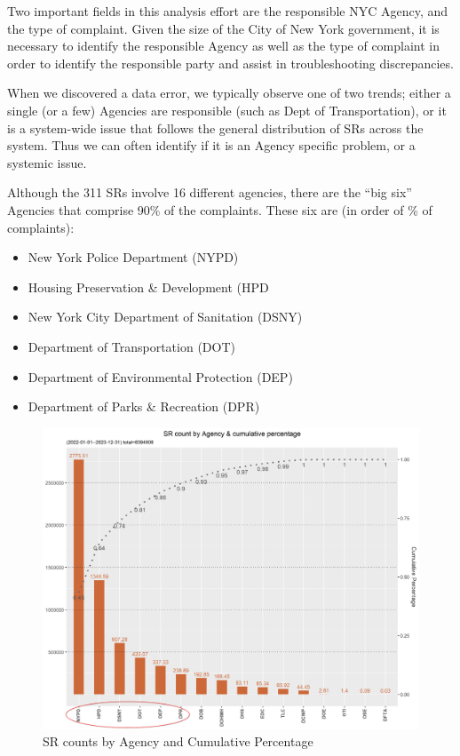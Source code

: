 \documentclass[12pt, titlepage]{article}
\begin{document}
\FloatBarrier %

Two important fields in this analysis effort are the responsible NYC Agency, and the type of complaint.
Given the size of the City of New York government, it is necessary to identify the responsible Agency as well as the type of complaint in order to 
identify the responsible party and assist in troubleshooting discrepancies.

When we discovered a data error, we typically observe one of two trends; either a single (or a few) Agencies are responsible (such as Dept of Transportation), 
or it is a system-wide issue that follows the general distribution of  SRs across the system. 
Thus we can often identify if it is an Agency specific problem, or a systemic issue.

Although the 311 SRs involve 16 different agencies, there are the ``big six'' Agencies that comprise
90\% of the complaints. These six are (in order of \% of complaints):  

\begin{itemize}
	\item New York Police Department (NYPD)
	\item Housing Preservation \& Development (HPD
	\item New York City Department of Sanitation (DSNY)
	\item Department of Transportation (DOT)
	\item Department of Environmental Protection (DEP)
	\item Department of Parks \& Recreation (DPR)
\end{itemize}

\begin{figure}[H]
  \centering
	  \includegraphics[width=\textwidth]{SRs_by_Agency.png}
	  \caption{SR counts by Agency and Cumulative Percentage}
	  
\end{figure}
\end{document}
